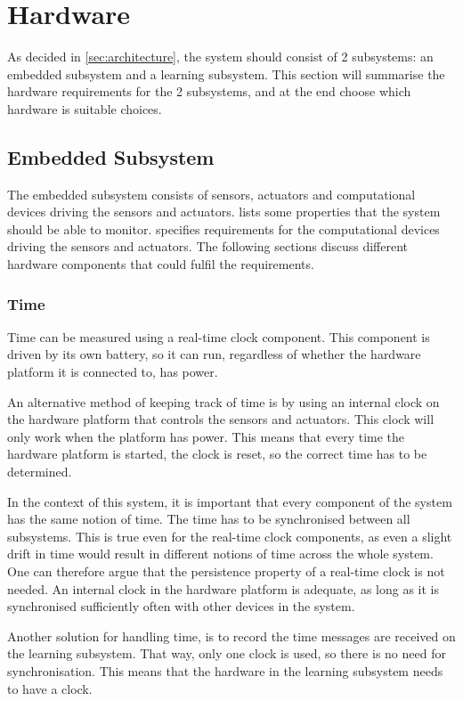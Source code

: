 \section{Hardware}
As decided in \cref{sec:architecture}, the system should consist of 2 subsystems: an embedded subsystem and a learning subsystem. This section will summarise the hardware requirements for the 2 subsystems, and at the end choose which hardware is suitable choices.



\subsection{Embedded Subsystem}
The embedded subsystem consists of sensors, actuators and computational devices driving the sensors and actuators.  lists some properties that the system should be able to monitor.  specifies requirements for the computational devices driving the sensors and actuators. The following sections discuss different hardware components that could fulfil the requirements.

\subsubsection{Time}
Time can be measured using a real-time clock component. This component is driven by its own battery, so it can run, regardless of whether the hardware platform it is connected to, has power.

An alternative method of keeping track of time is by using an internal clock on the hardware platform that controls the sensors and actuators. This clock will only work when the platform has power. This means that every time the hardware platform is started, the clock is reset, so the correct time has to be determined.

In the context of this system, it is important that every component of the system has the same notion of time. The time has to be synchronised between all subsystems. This is true even for the real-time clock components, as even a slight drift in time would result in different notions of time across the whole system. One can therefore argue that the persistence property of a real-time clock is not needed. An internal clock in the hardware platform is adequate, as long as it is synchronised sufficiently often with other devices in the system.

Another solution for handling time, is to record the time messages are received on the learning subsystem. That way, only one clock is used, so there is no need for synchronisation. This means that the hardware in the learning subsystem needs to have a clock.

